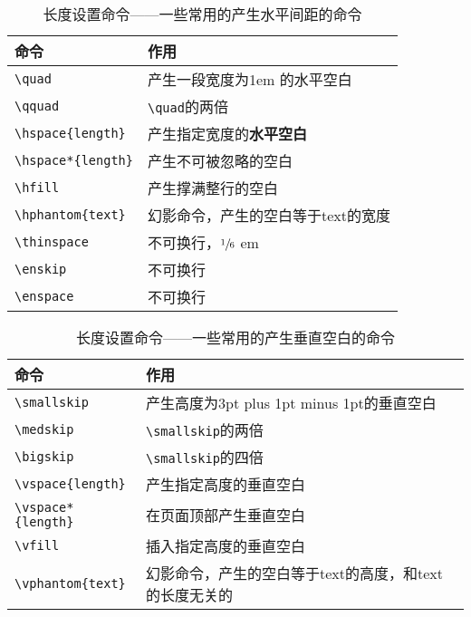 \begin{table}[!htbp]
    \centering
    \caption{长度设置命令——一些常用的产生水平间距的命令}
    \begin{tabular}{ll}
        \toprule
        命令 & 作用\\
        \midrule
        \verb|\quad| & 产生一段宽度为1em 的水平空白\\
        \verb|\qquad| & \verb|\quad|的两倍\\
        \verb|\hspace{length}| & 产生指定宽度的\textbf{水平空白}\\
        \verb|\hspace*{length}| & 产生不可被忽略的空白\\
        \verb|\hfill| & 产生撑满整行的空白\\
        \verb|\hphantom{text}| & 幻影命令，产生的空白等于text的宽度\\
        \verb|\thinspace| & 不可换行，$ \sfrac{1}{6} $ em\\
        \verb|\enskip| & 不可换行\\
        \verb|\enspace| & 不可换行\\
        \bottomrule
    \end{tabular}
\end{table}


\begin{table}[!htbp]
    \centering
    \caption{长度设置命令——一些常用的产生垂直空白的命令}
    \begin{tabular}{ll}
    \toprule
    命令 & 作用\\
    \midrule
    \verb|\smallskip| & 产生高度为3pt plus 1pt minus 1pt的垂直空白\\
    \verb|\medskip| & \verb|\smallskip|的两倍\\
    \verb|\bigskip| & \verb|\smallskip|的四倍\\
    \verb|\vspace{length}| & 产生指定高度的垂直空白\\
    \verb|\vspace*{length}| & 在页面顶部产生垂直空白\\
    \verb|\vfill| & 插入指定高度的垂直空白\\
    \verb|\vphantom{text}| & 幻影命令，产生的空白等于text的高度，和text的长度无关的\\
    \bottomrule
    \end{tabular}
\end{table}

